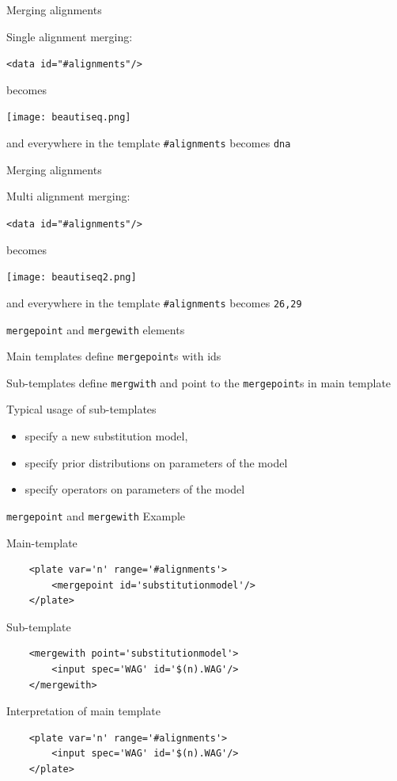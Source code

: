\documentclass{beamer}
\theoremstyle{definition}
\begin{document}
\begin{frame}[containsverbatim]{Merging alignments}

Single alignment merging:\vskip0.5cm

{\tt <data id="\#alignments"/>}\vskip0.5cm

becomes\vskip0.5cm

\texttt{[image: beautiseq.png]}\vskip0.5cm

and everywhere in the template {\tt \#alignments} becomes {\tt dna}

\end{frame}

\begin{frame}[containsverbatim]{Merging alignments}

Multi alignment merging:\vskip0.5cm

{\tt <data id="\#alignments"/>}\vskip0.5cm

becomes\vskip0.5cm

\texttt{[image: beautiseq2.png]}\vskip0.5cm

and everywhere in the template {\tt \#alignments} becomes {\tt 26,29}

\end{frame}

\begin{frame}[containsverbatim]{{\tt mergepoint} and {\tt mergewith} elements}

Main templates define {\tt mergepoint}s with ids\vskip0.5cm

Sub-templates define {\tt mergwith} and point to the {\tt mergepoint}s in main template\vskip0.5cm

Typical usage of sub-templates
\begin{itemize}
\item specify a new substitution model,
\item specify prior distributions on parameters of the model
\item specify operators on parameters of the model
\end{itemize}
\end{frame}

\begin{frame}[containsverbatim]{{\tt mergepoint} and {\tt mergewith} Example}

Main-template
\begin{verbatim}
    <plate var='n' range='#alignments'>
        <mergepoint id='substitutionmodel'/>
    </plate>
\end{verbatim}


Sub-template
\begin{verbatim}
    <mergewith point='substitutionmodel'>
        <input spec='WAG' id='$(n).WAG'/>
    </mergewith>
\end{verbatim}

Interpretation of main template

\begin{verbatim}
    <plate var='n' range='#alignments'>
        <input spec='WAG' id='$(n).WAG'/>
    </plate>
\end{verbatim}


\end{frame}
\end{document}
